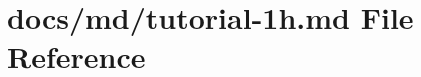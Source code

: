 \hypertarget{tutorial-1h_8md}{}\section{docs/md/tutorial-\/1h.md File Reference}
\label{tutorial-1h_8md}
